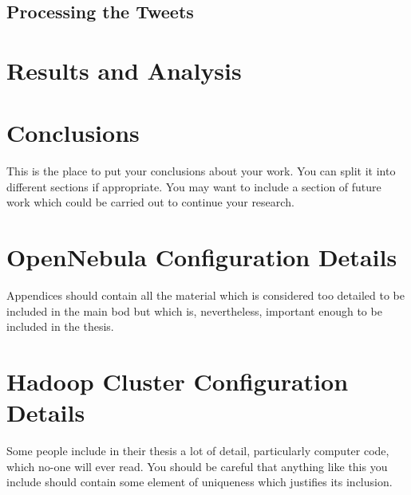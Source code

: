 \documentclass[12pt,a4paper]{report}
\begin{document}
\section{Processing the Tweets}

\chapter{Results and Analysis}


\chapter{Conclusions}

This is the place to put your conclusions about your work. You can
split it into different sections if appropriate. You may want to include
a section of future work which could be carried out to continue your
research.

\appendix

\chapter{OpenNebula Configuration Details}

Appendices should contain all the material which is considered too
detailed to be included in the main bod but which is, nevertheless,
important enough to be included in the thesis. 

\chapter{Hadoop Cluster Configuration Details}

Some  people include in their \cite{fox2009above}thesis a lot of detail, particularly
computer code, which no-one will ever read. You should be careful that
anything like this you include \cite{website:aws} should contain some element
 of \cite{weinman2011future}uniqueness which justifies its inclusion.





\end{document}
